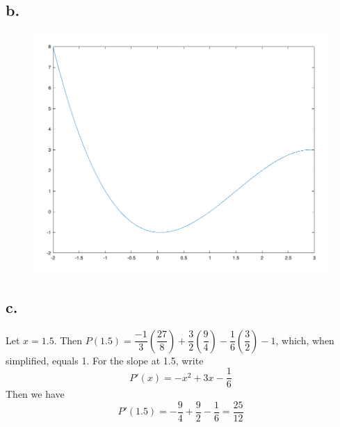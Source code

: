 \documentclass{article}
\begin{document}
\subsection*{b.}
\begin{figure}[h!]
	\includegraphics[scale=.3]{hw_5_matplot_graph}
\end{figure}

\subsection*{c.} Let $x = 1.5$. Then $P(1.5) = \dfrac{-1}{3}\left(\dfrac{27}{8}\right) + \dfrac{3}{2}\left(\dfrac{9}{4}\right) - \dfrac{1}{6}\left(\dfrac{3}{2}\right) - 1 $, which, when simplified, equals 1. For the slope at 1.5, write
	\[ P'(x) = -x^2 + 3x -\dfrac{1}{6}\] Then we have \[ P'(1.5) = -\dfrac{9}{4} + \dfrac{9}{2} - \dfrac{1}{6} = \dfrac{25}{12}\]
\end{document}
